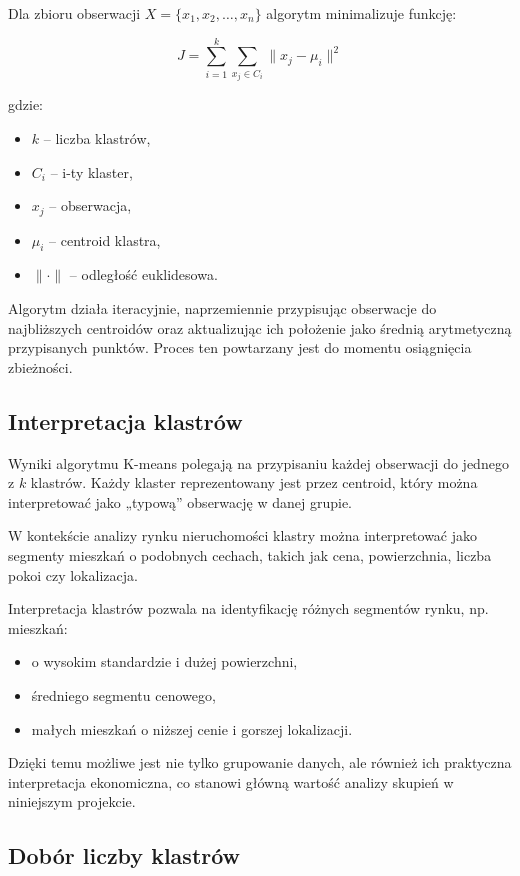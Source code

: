 \documentclass{report}
\begin{document}
Dla zbioru obserwacji \(X = \{x_1, x_2, \dots, x_n\}\) algorytm minimalizuje funkcję:

\[
J = \sum_{i=1}^{k} \sum_{x_j \in C_i} \|x_j - \mu_i\|^2
\]

gdzie:
\begin{itemize}
    \item \(k\) -- liczba klastrów,
    \item \(C_i\) -- i-ty klaster,
    \item \(x_j\) -- obserwacja,
    \item \(\mu_i\) -- centroid klastra,
    \item \(\|\cdot\|\) -- odległość euklidesowa.
\end{itemize}

Algorytm działa iteracyjnie, naprzemiennie przypisując obserwacje do najbliższych centroidów oraz aktualizując ich położenie jako średnią arytmetyczną przypisanych punktów. Proces ten powtarzany jest do momentu osiągnięcia zbieżności.

\subsection{Interpretacja klastrów}

Wyniki algorytmu K-means polegają na przypisaniu każdej obserwacji do jednego z \(k\) klastrów. Każdy klaster reprezentowany jest przez centroid, który można interpretować jako „typową” obserwację w danej grupie.

W kontekście analizy rynku nieruchomości klastry można interpretować jako segmenty mieszkań o podobnych cechach, takich jak cena, powierzchnia, liczba pokoi czy lokalizacja.

Interpretacja klastrów pozwala na identyfikację różnych segmentów rynku, np. mieszkań:
\begin{itemize}
    \item o wysokim standardzie i dużej powierzchni,
    \item średniego segmentu cenowego,
    \item małych mieszkań o niższej cenie i gorszej lokalizacji.
\end{itemize}

Dzięki temu możliwe jest nie tylko grupowanie danych, ale również ich praktyczna interpretacja ekonomiczna, co stanowi główną wartość analizy skupień w niniejszym projekcie.

\subsection{Dobór liczby klastrów}
\end{document}
